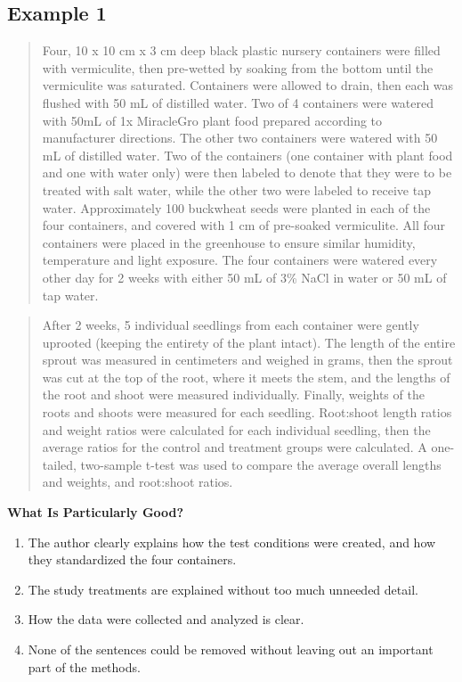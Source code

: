 \documentclass[
]{book}
\providecommand{\tightlist}{%
  \setlength{\itemsep}{0pt}\setlength{\parskip}{0pt}}
\begin{document}
\hypertarget{example-1-5}{%
\subsection{Example 1}\label{example-1-5}}

\begin{quote}
Four, 10 x 10 cm x 3 cm deep black plastic nursery containers were filled with vermiculite, then pre-wetted by soaking from the bottom until the vermiculite was saturated. Containers were allowed to drain, then each was flushed with 50 mL of distilled water. Two of 4 containers were watered with 50mL of 1x MiracleGro plant food prepared according to manufacturer directions. The other two containers were watered with 50 mL of distilled water. Two of the containers (one container with plant food and one with water only) were then labeled to denote that they were to be treated with salt water, while the other two were labeled to receive tap water. Approximately 100 buckwheat seeds were planted in each of the four containers, and covered with 1 cm of pre-soaked vermiculite. All four containers were placed in the greenhouse to ensure similar humidity, temperature and light exposure. The four containers were watered every other day for 2 weeks with either 50 mL of 3\% NaCl in water or 50 mL of tap water.
\end{quote}

\begin{quote}
After 2 weeks, 5 individual seedlings from each container were gently uprooted (keeping the entirety of the plant intact). The length of the entire sprout was measured in centimeters and weighed in grams, then the sprout was cut at the top of the root, where it meets the stem, and the lengths of the root and shoot were measured individually. Finally, weights of the roots and shoots were measured for each seedling. Root:shoot length ratios and weight ratios were calculated for each individual seedling, then the average ratios for the control and treatment groups were calculated. A one-tailed, two-sample t-test was used to compare the average overall lengths and weights, and root:shoot ratios.
\end{quote}

\textbf{What Is Particularly Good?}

\begin{enumerate}
\def\labelenumi{\arabic{enumi}.}
\tightlist
\item
  The author clearly explains how the test conditions were created, and how they standardized the four containers.
\item
  The study treatments are explained without too much unneeded detail.
\item
  How the data were collected and analyzed is clear.
\item
  None of the sentences could be removed without leaving out an important part of the methods.
\end{enumerate}
\end{document}
